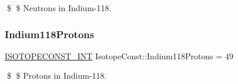 \$ \$ Neutrons in Indium-\/118. \mbox{\label{group___isotope_const-_indium-_in118_ga3f7503d6925678ec7643b5f8ca19b9a5}} 
\subsubsection{\texorpdfstring{Indium118\+Protons}{Indium118Protons}}
{\footnotesize\ttfamily \mbox{\hyperlink{group___isotope_const-_macros_ga5f18360b3e99483a35c32d789e62621c}{I\+S\+O\+T\+O\+P\+E\+C\+O\+N\+S\+T\+\_\+\+I\+NT}} Isotope\+Const\+::\+Indium118\+Protons = 49}

\$ \$ Protons in Indium-\/118. 
